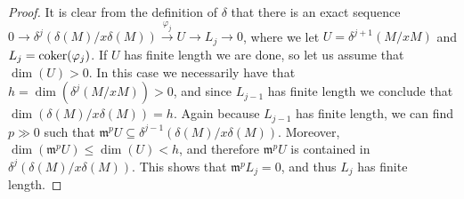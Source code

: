 \documentclass[12pt]{amsart}
\newcommand{\ooo}[1]{{\color{red} \sf $\clubsuit\clubsuit\clubsuit$ [#1]}}
\theoremstyle{definition}
\theoremstyle{definition}
\newcommand{\m}{\mathfrak{m}}
\newcommand{\ov}[1]{\overline{{#1}}}
\renewcommand{\leq}{\leqslant}
\renewcommand{\geq}{\geqslant}
\let\ov\overline
\let\lra\longrightarrow
\begin{document}
\begin{proof}
It is clear from the definition of $\delta$ that there is an exact sequence $0 \lra \delta^j(\delta(M)/x\delta(M)) \stackrel{\varphi_j}{\lra} U \lra L_j \lra 0$, where we let  $U=\delta^{j+1}(M/xM)$ and $L_j={\rm coker}(\varphi_j)$. If $U$ has finite length  we are done, so let us assume that $\dim(U)>0$. In this case we necessarily have that $h=\dim(\delta^j(M/xM))>0$, and since $L_{j-1}$ has finite length we conclude that $\dim(\delta(M)/x\delta(M))= h$. Again because $L_{j-1}$ has finite length, we can find $p \gg 0$ such that $\m^p U \subseteq \delta^{j-1}(\delta(M)/x\delta(M))$. Moreover, $\dim(\m^p U) \leq \dim(U)<h$, and therefore $\m^p U$ is contained in $\delta^{j}(\delta(M)/x\delta(M))$. This shows that $\m^p L_j=0$, and thus $L_j$ has finite length. 

\end{proof}
\end{document}
